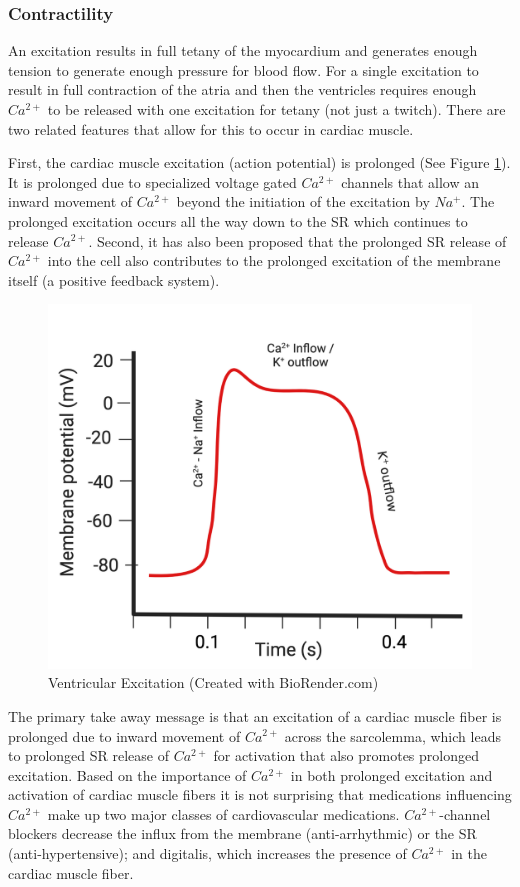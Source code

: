 \subsubsection{Contractility}

An excitation results in full tetany of the myocardium and generates enough tension to generate enough pressure for blood flow. For a single excitation to result in full contraction of the atria and then the ventricles requires enough $Ca^{2+}$ to be released with one excitation for tetany (not just a twitch). There are two related features that allow for this to occur in cardiac muscle. 

First, the cardiac muscle excitation (action potential) is prolonged (See Figure \ref{fig:Cardiac_Ventricular_AP}). It is prolonged due to specialized voltage gated $Ca^{2+}$ channels that allow an inward movement of $Ca^{2+}$ beyond the initiation of the excitation by $Na^+$. The prolonged excitation occurs all the way down to the SR which continues to release $Ca^{2+}$. Second, it has also been proposed that the prolonged SR release of $Ca^{2+}$ into the cell also contributes to the prolonged excitation of the membrane itself (a positive feedback system). 

\begin{figure}[!h]
    \centering
    \includegraphics[width=0.5\linewidth]{./figure/Cardiac_Ventricular_AP.png}
    \caption{Ventricular Excitation \footnotesize{(Created with BioRender.com)}}
    \label{fig:Cardiac_Ventricular_AP}
\end{figure}

The primary take away message is that an excitation of a cardiac muscle fiber is prolonged due to inward movement of $Ca^{2+}$ across the sarcolemma, which leads to prolonged SR release of $Ca^{2+}$ for activation that also promotes prolonged excitation. Based on the importance of $Ca^{2+}$ in both prolonged excitation and activation of cardiac muscle fibers it is not surprising that medications influencing $Ca^{2+}$ make up two major classes of cardiovascular medications. $Ca^{2+}$-channel blockers decrease the influx from the membrane (anti-arrhythmic) or the SR (anti-hypertensive); and digitalis, which increases the presence of $Ca^{2+}$ in the cardiac muscle fiber.


